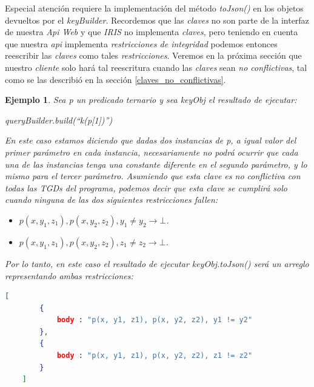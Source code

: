 \documentclass[11pt,a4paper,twoside]{tesis}
\newtheorem{exmp}{Ejemplo}
\begin{document}
Especial atención requiere la implementación del método \textit{toJson()} en los objetos devueltos por el \textit{keyBuilder}. Recordemos que las \textit{claves} no son parte de la interfaz de nuestra \textit{Api Web} y que \textit{IRIS} no implementa \textit{claves}, pero teniendo en cuenta que nuestra \textit{api} implementa \textit{restricciones de integridad} podemos entonces reescribir las \textit{claves} como tales \textit{restricciones}. Veremos en la próxima sección que nuestro \textit{cliente} solo hará tal reescritura cuando las \textit{claves} sean \textit{no conflictivas}, tal como se las describió en la sección \ref{claves_no_conflictivas}. 

\begin{exmp}
Sea \textit{p} un predicado ternario y sea \textit{keyObj} el resultado de ejecutar:

\begin{center}
   \textit{queryBuilder.build(``k(p[1])'')} 
\end{center}

En este caso estamos diciendo que dadas dos instancias de \textit{p}, a igual valor del primer parámetro en cada instancia, necesariamente no podrá ocurrir que cada una de las instancias tenga una constante diferente en el segundo parámetro, y lo mismo para el tercer parámetro. Asumiendo que esta \textit{clave} es no conflictiva con todas las \textit{TGDs} del  \textit{programa}, podemos decir que esta \textit{clave} se cumplirá solo cuando ninguna de las dos siguientes \textit{restricciones} fallen:


\begin{itemize}
    \item \textit{$p(x, y_1, z_1), p(x, y_2, z_2), y_1 \neq y_2 \rightarrow \bot$.}
    \item \textit{$p(x, y_1, z_1), p(x, y_2, z_2), z_1 \neq z_2 \rightarrow  \bot$.}
\end{itemize}

Por lo tanto, en este caso el resultado de ejecutar \textit{keyObj.toJson()} será un arreglo representando ambas \textit{restricciones}:

\begin{lstlisting}[language=json,firstnumber=1]
    [
        {
            body : "p(x, y1, z1), p(x, y2, z2), y1 != y2"
        },
        {
            body : "p(x, y1, z1), p(x, y2, z2), z1 != z2"
        }
    ]    
\end{lstlisting}
\end{exmp}
\end{document}

